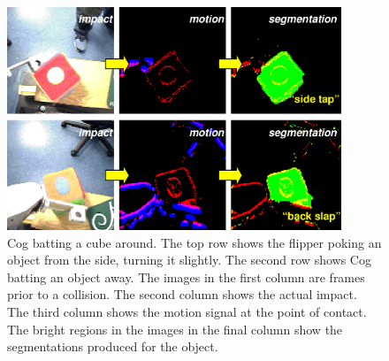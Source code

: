 



%
\begin{figure}[tb]
\begin{center}
\includegraphics[width=10cm]{fig-poke-batting.eps}
\caption{ 
\label{fig:poking-segmentation}
%
Cog batting a cube around.  The top row shows the flipper poking
an object from the side, turning it slightly.  The second
row shows Cog batting an object away.  The images in the first column
are frames prior to a collision.  The second column shows the actual
impact.  The third column shows the motion signal at the point of
contact.  The bright regions in the images in the final column show
the segmentations produced for the object. 
%
}
\end{center}
\end{figure}
%


